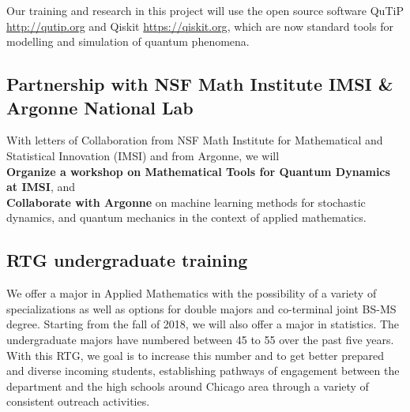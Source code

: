 \documentclass[11pt]{article}
\begin{document}


  

\smallskip

Our training and research in this project will use the open source software QuTiP \url{http://qutip.org} and Qiskit \url{https://qiskit.org}, which are now standard tools for modelling and simulation of quantum phenomena.



\subsection{Partnership with NSF Math Institute IMSI \& Argonne National Lab}

With letters of Collaboration from NSF Math Institute for Mathematical and Statistical Innovation (IMSI) and from Argonne, we will\\
\textbf{Organize a workshop on Mathematical Tools for Quantum Dynamics   at IMSI}, and \\
\textbf{Collaborate with Argonne} on machine learning methods for stochastic dynamics, and quantum mechanics in the context of applied mathematics. 




\subsection{RTG undergraduate training }
 
We offer a major in  Applied Mathematics with the possibility of a variety of specializations as well as options for double majors and co-terminal joint BS-MS degree. Starting from the fall of 2018, we will also offer a major in statistics. The undergraduate majors have numbered between 45 to 55 over the past five years. With this RTG, we goal is to increase this number and to get better prepared and diverse incoming students, establishing pathways of engagement between the department and the high schools around Chicago area through a variety of consistent outreach activities.
\end{document}

